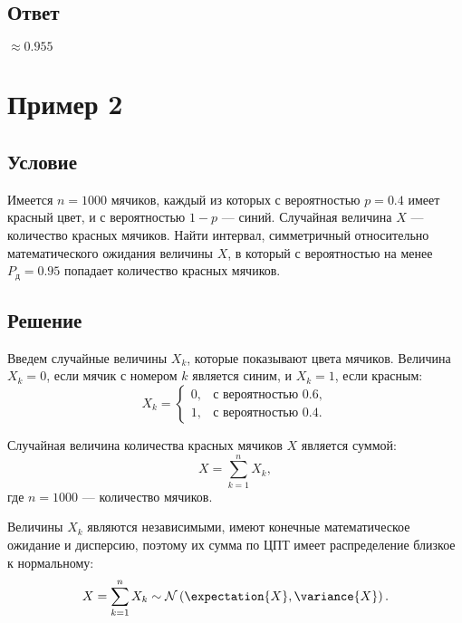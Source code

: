 \subsection*{Ответ}
$\approx 0.955$


\section{Пример 2}
\subsection*{Условие}
Имеется $n = 1000$ мячиков, каждый из которых с вероятностью $p = 0.4$ имеет красный цвет, и с вероятностью $1 - p$ --- синий.
Случайная величина $X$ --- количество красных мячиков. Найти интервал, симметричный относительно математического ожидания величины $X$,
в который с вероятностью на менее $P_\text{д} = 0.95$ попадает количество красных мячиков.
\subsection*{Решение}
Введем случайные величины $X_k$, которые показывают цвета мячиков. Величина $X_k = 0$, если мячик с номером $k$ является синим, и $X_k = 1$, если красным:
\begin{equation}
    X_k =
    \left \{
    \begin{array}{ll}
        0, & \text{с вероятностью } 0.6 , \\
        1, & \text{с вероятностью } 0.4 .
    \end{array}
    \right .
\end{equation}

Случайная величина количества красных мячиков $X$ является суммой:
\begin{equation}
    X = \sum_{k=1}^n X_k ,
\end{equation}
где $n = 1000$ --- количество мячиков.

Величины $X_k$ являются независимыми, имеют конечные математическое ожидание и дисперсию, поэтому их сумма по ЦПТ имеет распределение близкое
к нормальному:
\begin{equation}
    X = \sum_{k=1}^n X_k \sim \mathcal{N} \left ( \expectation{X}, \variance{X} \right ) .
\end{equation}

